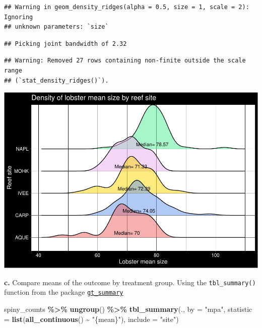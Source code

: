 \documentclass[
]{article}
\newenvironment{Shaded}{\begin{snugshade}}{\end{snugshade}}
\newcommand{\AttributeTok}[1]{\textcolor[rgb]{0.13,0.29,0.53}{#1}}
\newcommand{\FunctionTok}[1]{\textcolor[rgb]{0.13,0.29,0.53}{\textbf{#1}}}
\newcommand{\NormalTok}[1]{#1}
\newcommand{\SpecialCharTok}[1]{\textcolor[rgb]{0.81,0.36,0.00}{\textbf{#1}}}
\newcommand{\StringTok}[1]{\textcolor[rgb]{0.31,0.60,0.02}{#1}}
\begin{document}
\begin{verbatim}
## Warning in geom_density_ridges(alpha = 0.5, size = 1, scale = 2): Ignoring
## unknown parameters: `size`
\end{verbatim}

\begin{verbatim}
## Picking joint bandwidth of 2.32
\end{verbatim}

\begin{verbatim}
## Warning: Removed 27 rows containing non-finite outside the scale range
## (`stat_density_ridges()`).
\end{verbatim}

\includegraphics{hw1-lobstrs-eds241_files/figure-latex/unnamed-chunk-11-1.pdf}

\textbf{c.} Compare means of the outcome by treatment group. Using the
\texttt{tbl\_summary()} function from the package
\href{https://www.danieldsjoberg.com/gtsummary/articles/tbl_summary.html}{\texttt{gt\_summary}}

\begin{Shaded}
\begin{Highlighting}[]
\NormalTok{spiny\_counts }\SpecialCharTok{\%\textgreater{}\%}
  \FunctionTok{ungroup}\NormalTok{() }\SpecialCharTok{\%\textgreater{}\%}
  \FunctionTok{tbl\_summary}\NormalTok{(.,}
            \AttributeTok{by =} \StringTok{"mpa"}\NormalTok{,}
            \AttributeTok{statistic =} \FunctionTok{list}\NormalTok{(}\FunctionTok{all\_continuous}\NormalTok{() }\SpecialCharTok{\textasciitilde{}} \StringTok{"\{mean\}"}\NormalTok{),}
            \AttributeTok{include =} \StringTok{"site"}\NormalTok{) }
\end{Highlighting}
\end{Shaded}
\end{document}
